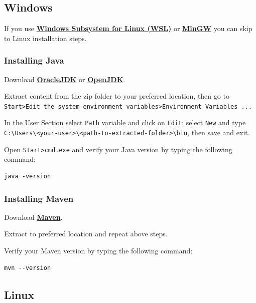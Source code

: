 \documentclass[table, 12pt]{article}
\begin{document}
\subsection{Windows}\label{windows}


If you use
\textbf{\href{https://docs.microsoft.com/en-us/windows/wsl/install-win10}{Windows
Subsystem for Linux (WSL)}} or \textbf{\href{http://mingw-w64.org/doku.php}{MinGW}} you
can skip to Linux installation steps.

\subsubsection{Installing Java}\label{installing-java}

Download \textbf{\href{https://jdk.java.net/15/}{OracleJDK}} or \textbf{\href{https://openjdk.java.net/projects/jdk/15/}{OpenJDK}}.

Extract content from the zip folder to your preferred location, then go
to
\texttt{Start\textgreater{}Edit the system environment variables\textgreater{}Environment Variables ...}

In the User Section select \texttt{Path} variable and click on
\texttt{Edit}; select \texttt{New} and type
\texttt{C:\textbackslash{}Users\textbackslash{}\textless{}your-user\textgreater{}\textbackslash{}\textless{}path-to-extracted-folder\textgreater{}\textbackslash{}bin},
then save and exit.

Open \texttt{Start\textgreater{}cmd.exe} and verify your Java version by
typing the following command:

\begin{verbatim}
java -version
\end{verbatim}

\subsubsection{Installing Maven}\label{installing-maven}

Download
\textbf{\href{https://mirror.nohup.it/apache/maven/maven-3/3.6.3/binaries/apache-maven-3.6.3-bin.zip}{Maven}}.

Extract to preferred location and repeat above steps.

Verify your Maven version by typing the following command:

\begin{verbatim}
mvn --version
\end{verbatim}

\subsection{Linux}\label{linux}
\end{document}
